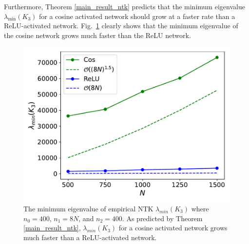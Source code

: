 \documentclass{article}
\theoremstyle{plain}
\theoremstyle{definition}
\theoremstyle{remark}
\begin{document}

Furthermore, Theorem \ref{main_result_ntk} predicts that the minimum eigenvalue $\lambda_{\min}(K_3)$ for a cosine activated network should grow at a faster rate than a ReLU-activated network. 
Fig.~\ref{fig:ntk1} clearly shows that the minimum eigenvalue of the cosine network grows much faster than the ReLU network.

\begin{figure}[t]
\includegraphics[width=1.0\linewidth]{experiments/ICML_mineigval_fixn2_8N.pdf}
\hspace{-0.4cm}
\caption{The minimum eigenvalue of empirical NTK $\lambda_{min}(K_3)$ where $n_0 = 400$, $n_{1} = 8N$,  and $n_2=400$. As predicted by Theorem \ref{main_result_ntk}, $\lambda_{min}(K_3)$ for a cosine activated network grows much faster than a ReLU-activated network. }\label{fig:ntk1}
\end{figure}

\end{document}
